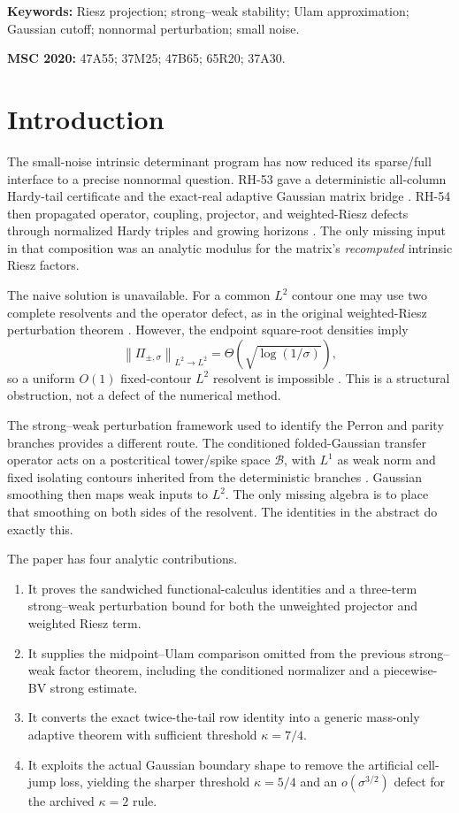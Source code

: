 \documentclass[11pt]{article}
\theoremstyle{remark}
\newcommand{\cB}{\mathcal B}
\newcommand{\norm}[1]{\left\lVert #1\right\rVert}
\begin{document}
\noindent\textbf{Keywords:} Riesz projection; strong--weak stability;
Ulam approximation; Gaussian cutoff; nonnormal perturbation; small noise.

\medskip
\noindent\textbf{MSC 2020:} 47A55; 37M25; 47B65; 65R20; 37A30.

\section{Introduction}

The small-noise intrinsic determinant program has now reduced its
sparse/full interface to a precise nonnormal question.  RH-53 gave a
deterministic all-column Hardy-tail certificate and the exact-real adaptive
Gaussian matrix bridge \citep{WangHardyTail2026}.  RH-54 then propagated
operator, coupling, projector, and weighted-Riesz defects through normalized
Hardy triples and growing horizons \citep{WangFactorAware2026}.  The only
missing input in that composition was an analytic modulus for the matrix's
\emph{recomputed} intrinsic Riesz factors.

The naive solution is unavailable.  For a common $L^2$ contour one may use
two complete resolvents and the operator defect, as in the original
weighted-Riesz perturbation theorem \citep{WangWeightedRiesz2026}.  However,
the endpoint square-root densities imply
\[
 \norm{\Pi_{\pm,\sigma}}_{L^2\to L^2}
 =\Theta\!\left(\sqrt{\log(1/\sigma)}\right),
\]
so a uniform $O(1)$ fixed-contour $L^2$ resolvent is impossible
\citep{WangLogConditioning2026}.  This is a structural obstruction, not a
defect of the numerical method.

The strong--weak perturbation framework used to identify the Perron and
parity branches provides a different route.  The conditioned folded-Gaussian
transfer operator acts on a postcritical tower/spike space $\cB$, with
$L^1$ as weak norm and fixed isolating contours inherited from the
deterministic branches \citep{WangBoundaryLayer2026,WangFactorTransfer2026}.
Gaussian smoothing then maps weak inputs to $L^2$.  The only missing algebra
is to place that smoothing on both sides of the resolvent.  The identities in
the abstract do exactly this.

The paper has four analytic contributions.

\begin{enumerate}[leftmargin=2em]
 \item It proves the sandwiched functional-calculus identities and a
 three-term strong--weak perturbation bound for both the unweighted
 projector and weighted Riesz term.
 \item It supplies the midpoint--Ulam comparison omitted from the previous
 strong--weak factor theorem, including the conditioned normalizer and a
 piecewise-BV strong estimate.
 \item It converts the exact twice-the-tail row identity into a generic
 mass-only adaptive theorem with sufficient threshold $\kappa=7/4$.
 \item It exploits the actual Gaussian boundary shape to remove the
 artificial cell-jump loss, yielding the sharper threshold $\kappa=5/4$
 and an $o(\sigma^{3/2})$ defect for the archived $\kappa=2$ rule.
\end{enumerate}
\end{document}
